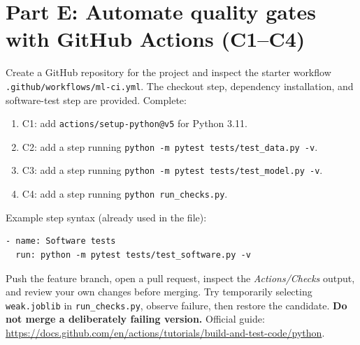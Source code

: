\documentclass[11pt,a4paper]{article}
\begin{document}
\section{Part E: Automate quality gates with GitHub Actions (C1--C4)}
Create a GitHub repository for the project and inspect the starter workflow \texttt{.github/workflows/ml-ci.yml}. The checkout step, dependency installation, and software-test step are provided. Complete:
\begin{enumerate}
\item C1: add \texttt{actions/setup-python@v5} for Python 3.11.
\item C2: add a step running \texttt{python -m pytest tests/test\_data.py -v}.
\item C3: add a step running \texttt{python -m pytest tests/test\_model.py -v}.
\item C4: add a step running \texttt{python run\_checks.py}.
\end{enumerate}
Example step syntax (already used in the file):
\begin{lstlisting}
- name: Software tests
  run: python -m pytest tests/test_software.py -v
\end{lstlisting}
Push the feature branch, open a pull request, inspect the \emph{Actions/Checks} output, and review your own changes before merging. Try temporarily selecting \texttt{weak.joblib} in \texttt{run\_checks.py}, observe failure, then restore the candidate. \textbf{Do not merge a deliberately failing version.} Official guide: \url{https://docs.github.com/en/actions/tutorials/build-and-test-code/python}.
\end{document}
